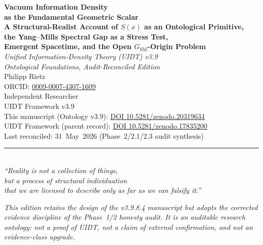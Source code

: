 \documentclass[12pt,a4paper,twoside]{article}
\theoremstyle{plain}
\theoremstyle{definition}
\theoremstyle{remark}
\begin{document}
\pagestyle{uidtontology}

\begin{titlepage}
\vspace*{1.6cm}
\begin{center}
{\LARGE\bfseries Vacuum Information Density\\[0.25em]
as the Fundamental Geometric Scalar}\\[0.9em]
{\small\bfseries A Structural-Realist Account of \(S(x)\) as an Ontological Primitive,\\[0.25em]
the Yang--Mills Spectral Gap as a Stress Test,\\[0.25em]
Emergent Spacetime, and the Open \(G_{\mathrm{SM}}\)-Origin Problem}\\[1.5em]
{\large\itshape Unified Information-Density Theory (UIDT) v3.9\\[0.25em]
Ontological Foundations, Audit-Reconciled Edition}\\[2.6em]
{\Large Philipp Rietz}\\[0.5em]
{\small ORCID: \href{https://orcid.org/0009-0007-4307-1609}{0009-0007-4307-1609}}\\[0.2em]
{\small Independent Researcher}\\[3em]
{\normalsize UIDT Framework v3.9}\\[0.5em]
{\small This manuscript (Ontology v3.9):
\href{https://doi.org/10.5281/zenodo.20319634}{DOI 10.5281/zenodo.20319634}}\\[0.25em]
{\small UIDT Framework (parent record):
\href{https://doi.org/10.5281/zenodo.17835200}{DOI 10.5281/zenodo.17835200}}\\[0.5em]
{\small Last reconciled: 31~May~2026 (Phase~2/2.1/2.3 audit synthesis)}\\[2.2em]
\rule{0.6\textwidth}{0.4pt}\\[1em]
{\small\itshape ``Reality is not a collection of things,\\
but a process of structural individuation\\
that we are licensed to describe only as far as we can falsify it.''}\\[1.4em]
\begin{minipage}{0.82\textwidth}
\footnotesize\centering\itshape\color{darkgray}
This edition retains the design of the v3.9.8.4 manuscript but adopts the
corrected evidence discipline of the Phase~1/2 honesty audit. It is an
auditable research ontology: not a proof of UIDT, not a claim of external
confirmation, and not an evidence-class upgrade.
\end{minipage}
\end{center}
\end{titlepage}
\end{document}
